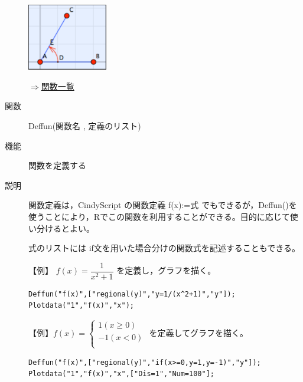\documentclass[papersize,a4paper,12pt,uplatex]{jsarticle}
\begin{document}
\begin{description}
\vspace{\baselineskip}
\hspace{20mm} \includegraphics[width=3.5cm,bb=0 0 161 134]{Fig/setcolor.pdf} 

\begin{flushright}\hyperlink{functionlist}{$\Rightarrow$関数一覧}\end{flushright}

\vspace{\baselineskip}
\hypertarget{deffun}{}
\item[関数]Deffun(関数名 , 定義のリスト)
\item[機能]関数を定義する
\item[説明]関数定義は，CindyScript の関数定義 f(x):=式 でもできるが，Deffun()を使うことにより，Rでこの関数を利用することができる。目的に応じて使い分けるとよい。

式のリストには if文を用いた場合分けの関数式を記述することもできる。

\vspace{\baselineskip}
【例】
$f(x)=\dfrac{1}{x^2+1}$ を定義し，グラフを描く。

\begin{verbatim}
Deffun("f(x)",["regional(y)","y=1/(x^2+1)","y"]);
Plotdata("1","f(x)","x");
\end{verbatim}

\vspace{\baselineskip}
\hspace{20mm}\scalebox{0.9}{}


\vspace{\baselineskip}
【例】$f(x)=\left\{\begin{array}{l}1　 (x\geq 0)\\ -1 　 (x<0)\\ \end{array}\right.$ を定義してグラフを描く。

\begin{verbatim}
Deffun("f(x)",["regional(y)","if(x>=0,y=1,y=-1)","y"]);
Plotdata("1","f(x)","x",["Dis=1","Num=100"];
\end{verbatim}

\vspace{\baselineskip}
\hspace{20mm}\scalebox{0.9}{}


\end{description}
\end{document}
